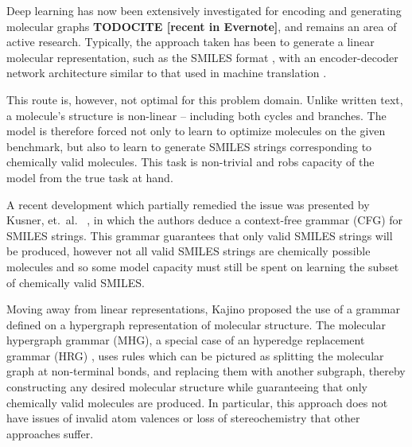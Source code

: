 \documentclass{article}
\newcommand{\CITE}[1]{{\bf TODOCITE [#1]}}
\begin{document}
Deep learning has now been extensively investigated for encoding and generating molecular graphs \cite{duvenaud2015, kearnes2016, gilmer2017} \CITE{recent in Evernote}, and remains an area of active research. Typically, the approach taken has been to generate a linear molecular representation, such as the SMILES format \cite{weininger1988}, with an encoder-decoder network architecture similar to that used in machine translation \cite{gomezbombarelli2016}.

This route is, however, not optimal for this problem domain. Unlike written text, a molecule's structure is non-linear -- including both cycles and branches. The model is therefore forced not only to learn to optimize molecules on the given benchmark, but also to learn to generate SMILES strings corresponding to chemically valid molecules. This task is non-trivial and robs capacity of the model from the true task at hand.

A recent development which partially remedied the issue was presented by Kusner, et.~al.~ \cite{kusner2017}, in which the authors deduce a context-free grammar (CFG) for SMILES strings. This grammar guarantees that only valid SMILES strings will be produced, however not all valid SMILES strings are chemically possible molecules and so some model capacity must still be spent on learning the subset of chemically valid SMILES.


Moving away from linear representations, Kajino \cite{kajino2018} proposed the use of a grammar defined on a hypergraph representation of molecular structure. The molecular hypergraph grammar (MHG), a special case of an hyperedge replacement grammar (HRG) \cite{drewes1997}, uses rules which can be pictured as splitting the molecular graph at non-terminal bonds, and replacing them with another subgraph, thereby constructing any desired molecular structure while guaranteeing that only chemically valid molecules are produced. In particular, this approach does not have issues of invalid atom valences or loss of stereochemistry that other approaches suffer.
\end{document}
